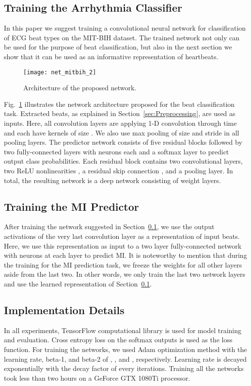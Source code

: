 \documentclass[10pt, conference, compsocconf]{IEEEtran}
\begin{document}
\subsection{Training the Arrhythmia Classifier}
\label{sec:Training the Arrhythmia Classifier}
In this paper we suggest training a convolutional neural network for classification of ECG beat types on the MIT-BIH dataset. The trained network not only can be used for the purpose of beat classification, but also in the next section we show that it can be used as an informative representation of heartbeats.

\begin{figure}[!t]
\centering
\texttt{[image: net\_mitbih\_2]}\caption{Architecture of the proposed network.}
\label{fig:net_mitbih}
\end{figure}

Fig.~\ref{fig:net_mitbih} illustrates the network architecture proposed for the beat classification task. Extracted beats, as explained in Section~\ref{sec:Preprocessing}, are used as inputs. Here, all convolution layers are applying 1-D convolution through time and each have  kernels of size . We also use max pooling of size  and stride  in all pooling layers. The predictor network consists of five residual blocks followed by two fully-connected layers with  neurons each and a softmax layer to predict output class probabilities. Each residual block contains two convolutional layers, two ReLU nonlinearities \cite{nair2010rectified}, a residual skip connection \cite{he2016deep}, and a pooling layer. In total, the resulting network is a deep network consisting of  weight layers.

\subsection{Training the MI Predictor}
After training the network suggested in Section~\ref{sec:Training the Arrhythmia Classifier}, we use the output activations of the very last convolution layer as a representation of input beats. Here, we use this representation as input to a two layer fully-connected network with  neurons at each layer to predict MI. It is noteworthy to mention that during the training for the MI prediction task, we freeze the weights for all other layers aside from the last two. In other words, we only train the last two network layers and use the learned representation of Section~\ref{sec:Training the Arrhythmia Classifier}. 

\subsection{Implementation Details}
In all experiments, TensorFlow computational library \cite{abadi2016tensorflow} is used for model training and evaluation. Cross entropy loss on the softmax outputs is used as the loss function. For training the networks, we used Adam optimization method \cite{kingma2014adam} with the learning rate, beta-1, and beta-2 of , , and , respectively. Learning rate is decayed exponentially with the decay factor of  every  iterations. Training all the networks took less than two hours on a GeForce GTX 1080Ti processor.
\end{document}
